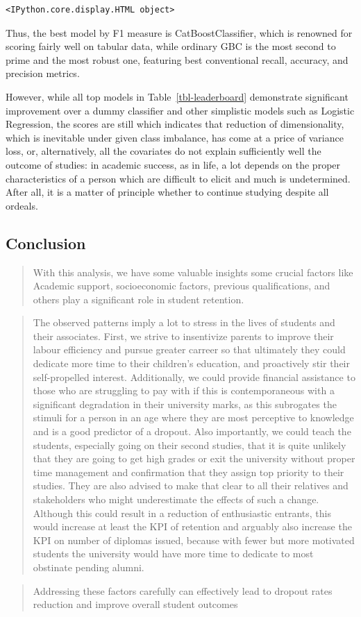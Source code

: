 \documentclass[
  letterpaper,
  DIV=11,
  numbers=noendperiod]{scrartcl}
\begin{document}
\begin{verbatim}
<IPython.core.display.HTML object>
\end{verbatim}

Thus, the best model by F1 measure is CatBoostClassifier, which is
renowned for scoring fairly well on tabular data, while ordinary GBC is
the most second to prime and the most robust one, featuring best
conventional recall, accuracy, and precision metrics.

However, while all top models in Table~\ref{tbl-leaderboard} demonstrate
significant improvement over a dummy classifier and other simplistic
models such as Logistic Regression, the scores are still which indicates
that reduction of dimensionality, which is inevitable under given class
imbalance, has come at a price of variance loss, or, alternatively, all
the covariates do not explain sufficiently well the outcome of studies:
in academic success, as in life, a lot depends on the proper
characteristics of a person which are difficult to elicit and much is
undetermined. After all, it is a matter of principle whether to continue
studying despite all ordeals.

\hypertarget{conclusion}{%
\subsection{\texorpdfstring{\textbf{Conclusion}}{Conclusion}}\label{conclusion}}

\begin{quote}
With this analysis, we have some valuable insights some crucial factors
like Academic support, socioeconomic factors, previous qualifications,
and others play a significant role in student retention.
\end{quote}

\begin{quote}
The observed patterns imply a lot to stress in the lives of students and
their associates. First, we strive to insentivize parents to improve
their labour efficiency and pursue greater carreer so that ultimately
they could dedicate more time to their children's education, and
proactively stir their self-propelled interest. Additionally, we could
provide financial assistance to those who are struggling to pay with if
this is contemporaneous with a significant degradation in their
university marks, as this subrogates the stimuli for a person in an age
where they are most perceptive to knowledge and is a good predictor of a
dropout. Also importantly, we could teach the students, especially going
on their second studies, that it is quite unlikely that they are going
to get high grades or exit the university without proper time management
and confirmation that they assign top priority to their studies. They
are also advised to make that clear to all their relatives and
stakeholders who might underestimate the effects of such a change.
Although this could result in a reduction of enthusiastic entrants, this
would increase at least the KPI of retention and arguably also increase
the KPI on number of diplomas issued, because with fewer but more
motivated students the university would have more time to dedicate to
most obstinate pending alumni.
\end{quote}

\begin{quote}
Addressing these factors carefully can effectively lead to dropout rates
reduction and improve overall student outcomes
\end{quote}


\printbibliography
\end{document}
